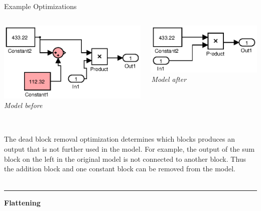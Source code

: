 \documentclass[final,hyperref={pdfpagelabels=false}]{beamer}
\begin{document}
\begin{frame}{}
\begin{columns}[t]
\begin{column}{.585\linewidth}
\begin{block}{Example Optimizations}
\begin{columns}[c]
\begin{column}{.485\linewidth}
\begin{center}
         \includegraphics[width=0.8\linewidth]{images/models/HSimpleConstDead}\\
          \footnotesize \textit{Model before}
         \end{center}
         \end{column}
         \begin{column}{.485\linewidth}
         \begin{center}
         \includegraphics[width=0.8\linewidth]{images/models/HSimpleConstDead_export}\\
        \footnotesize \textit{Model after}
         \end{center}
         \end{column}
         \end{columns}
          \footnotesize ~\\
         The dead block removal optimization determines which blocks produces an output that is not further used in the model. For example, the output of the sum block on the left in the original model is not connected to another block. Thus the addition block and one constant block can be removed from the model.
          ~\\~\\
         \hrule
         \small
          \begin{center}\textbf{Flattening}\end{center}
                 
         \begin{columns}[c]
         \begin{column}{.485\linewidth}
         \begin{center}
         

\end{center}
\end{column}
\end{columns}
\end{block}
\end{column}
\end{columns}
\end{frame}
\end{document}
